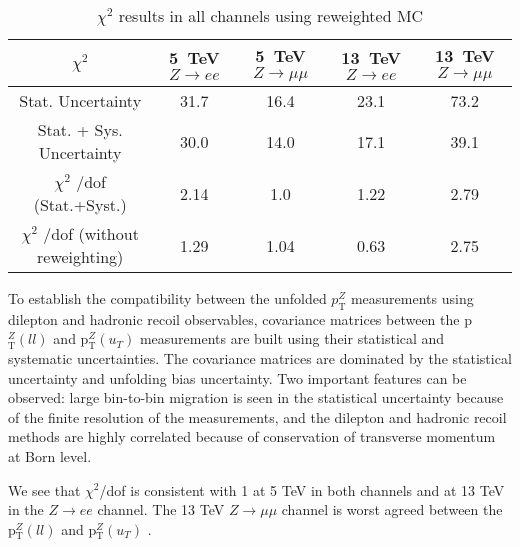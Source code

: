\begin{table}[h]
\centering
\begin{tabular}{|c|c|c|c|c|}
\hline
$\chi^2$ & 5~TeV $Z\rightarrow ee$ & 5~TeV $Z\rightarrow \mu\mu$ & 13~TeV $Z\rightarrow ee$ & 13~TeV $Z\rightarrow \mu\mu$\\
\hline
Stat. Uncertainty & 31.7 & 16.4 & 23.1 & 73.2 \\
\hline
Stat. + Sys. Uncertainty & 30.0& 14.0 & 17.1 & 39.1 \\
\hline
$\chi^2$ /dof (Stat.+Syst.) & 2.14 &1.0 & 1.22 & 2.79 \\
\hline
 {\color{blue} $\chi^2$ /dof (without reweighting) }& 1.29 &1.04 & 0.63 & 2.75 \\
\hline
\end{tabular}
\caption{$\chi^2$ results in all channels using reweighted MC}
\label{tab:chi2Rew}
\end{table}




To establish the compatibility between the unfolded $p_{\mathrm{T}}^{Z}$  measurements using dilepton and hadronic recoil observables, covariance matrices between the p$_{\mathrm{T}}^{Z}(ll)$ and p$_\mathrm{T}^{Z}(u_T)$ measurements are built using their statistical and systematic uncertainties. The covariance matrices are dominated by the statistical uncertainty and unfolding bias uncertainty. Two important features can be observed: large bin-to-bin migration is seen in the statistical uncertainty because of the finite resolution of the measurements, and the dilepton and hadronic recoil methods are highly correlated because of conservation of transverse momentum at Born level.

We see that $\chi^2$/dof is consistent with 1 at 5 TeV in both channels and at 13 TeV in the $Z\rightarrow ee$ channel. The 13 TeV $Z\rightarrow \mu\mu$ channel is worst agreed between the p$_{\mathrm{T}}^{Z}(ll)$ and p$_\mathrm{T}^{Z}(u_T)$ .%
